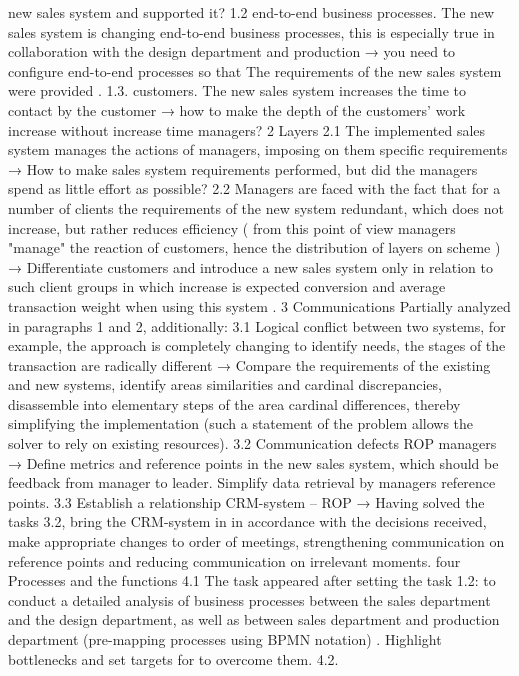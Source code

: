 new sales system and supported it?
1.2
end-to-end business processes. The new sales system is changing end-to-end business processes,
this is especially true in collaboration with the design department and
production → you need to configure end-to-end processes so that
The requirements of the new sales system were provided .
1.3.
customers. The new sales system increases the time to contact
by the customer → how to make the depth of the customers' work increase without
increase time managers?
2
Layers
2.1
The implemented sales system manages the actions of managers, imposing on them
specific requirements → How to make sales system requirements
performed, but did the managers spend as little effort as possible?
2.2
Managers are faced with the fact that for a number of clients the requirements of the new system
redundant, which does not increase, but rather reduces efficiency ( from this point of view
managers "manage" the reaction of customers, hence the distribution of layers on
scheme ) → Differentiate customers and introduce a new sales system
only in relation to such client groups in which increase is expected
conversion and average transaction weight when using this system .
3
Communications
Partially analyzed in paragraphs 1 and 2, additionally:
3.1
Logical conflict between two systems, for example, the approach is completely changing
to identify needs, the stages of the transaction are radically different →
Compare the requirements of the existing and new systems, identify areas
similarities and cardinal discrepancies, disassemble into elementary steps of the area
cardinal differences, thereby simplifying the implementation (such a statement of the problem
allows the solver to rely on existing resources).
3.2
Communication defects ROP managers → Define metrics and reference points in
the new sales system, which should be feedback from
manager to leader. Simplify data retrieval by managers
reference points.
3.3
Establish a relationship CRM-system -- ROP → Having solved the tasks 3.2, bring the CRM-system in
in accordance with the decisions received, make appropriate changes to
order of meetings, strengthening communication on reference points and
reducing communication on irrelevant moments.
four
Processes and
the functions
4.1
The task appeared after setting the task 1.2: to conduct a detailed analysis of business
processes between the sales department and the design department, as well as between
sales department and production department (pre-mapping
processes using BPMN notation) . Highlight bottlenecks and set targets for
to overcome them.
4.2.
